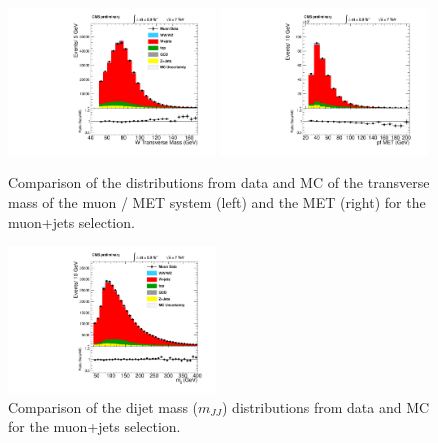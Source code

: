 \begin{figure}[h!t]
  {\centering
    \includegraphics[width=0.49\textwidth]{plots/2012_DataMC/mu_W_mt.pdf}
    \includegraphics[width=0.49\textwidth]{plots/2012_DataMC/mu_event_met_pfmet.pdf}
    \caption{Comparison of the distributions from data and MC of the
     transverse mass of the muon / MET system (left) and the MET (right)
    for the muon+jets selection.
    }
    \label{fig:mu_W_Mt}}
\end{figure}
\begin{figure}[h!t]
  {\centering
    \includegraphics[width=0.49\textwidth]{plots/2012_DataMC/mu_mjj.pdf}
    \caption{Comparison of the dijet mass ($m_{JJ}$) distributions from data and MC for 
      the muon+jets selection. }
    \label{fig:mu_mjj}}
\end{figure}

